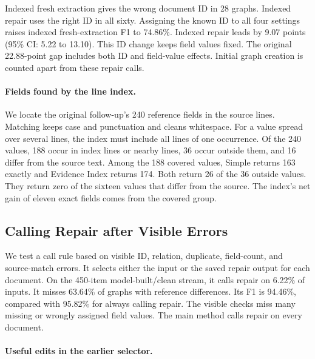 Indexed fresh extraction gives the wrong document ID in 28 graphs.
Indexed repair uses the right ID in all sixty.
Assigning the known ID to all four settings raises indexed fresh-extraction
F1 to 74.86\%. Indexed repair leads by 9.07 points
(95\% CI: 5.22 to 13.10). This ID change keeps field values fixed.
The original 22.88-point gap includes both ID and field-value effects.
Initial graph creation is counted apart from these repair calls.

\paragraph{Fields found by the line index.}

We locate the original follow-up's 240 reference fields in the source lines.
Matching keeps case and punctuation and cleans whitespace.
For a value spread over several lines, the index must include all lines of
one occurrence. Of the 240 values, 188 occur in index lines or nearby lines,
36 occur outside them, and 16 differ from the source text.
Among the 188 covered values, Simple returns 163 exactly and Evidence Index
returns 174. Both return 26 of the 36 outside values.
They return zero of the sixteen values that differ from the source.
The index's net gain of eleven exact fields comes from the covered group.

\subsection{Calling Repair after Visible Errors}
\label{app:call_policy}

We test a call rule based on visible ID, relation, duplicate, field-count,
and source-match errors. It selects either the input or the saved repair
output for each document. On the 450-item model-built/clean stream,
it calls repair on 6.22\% of inputs. It misses 63.64\% of graphs with
reference differences. Its F1 is 94.46\%, compared with 95.82\% for
always calling repair. The visible checks miss many missing or wrongly
assigned field values. The main method calls repair on every document.

\paragraph{Useful edits in the earlier selector.}

